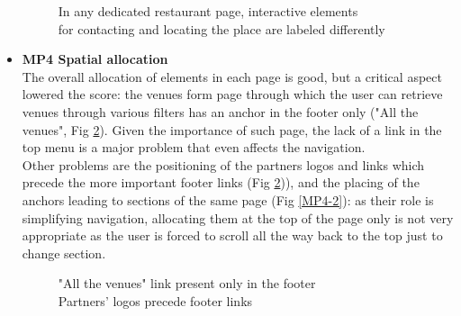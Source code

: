 \begin{itemize}
\begin{figure}[!ht]
\begin{minipage}{\linewidth}
                \captionsetup{justification=centering}
                \caption{In any dedicated restaurant page, interactive elements\\for contacting and locating the place are labeled differently}
                \label{MP3-2}
            \end{minipage}
        \end{figure}
        \pagebreak
    \item \textbf{MP4 Spatial allocation}\\
        The overall allocation of elements in each page is good, but a critical aspect lowered the score: the venues form page through which the user can retrieve venues through various filters has an anchor in the footer only ("All the venues", Fig \ref{MP4-1}). Given the importance of such page, the lack of a link in the top menu is a major problem that even affects the navigation.\\
        Other problems are the positioning of the partners logos and links which precede the more important footer links (Fig \ref{MP4-1})), and the placing of the anchors leading to sections of the same page (Fig \ref{MP4-2}): as their role is simplifying navigation, allocating them at the top of the page only is not very appropriate as the user is forced to scroll all the way back to the top just to change section.
        \begin{figure}[!ht]
            \begin{minipage}{\linewidth}
                \centering
                \captionsetup{justification=centering}
                \caption{"All the venues" link present only in the footer\\Partners' logos precede footer links}
                \label{MP4-1}
            \end{minipage}
        \end{figure}

\end{itemize}
